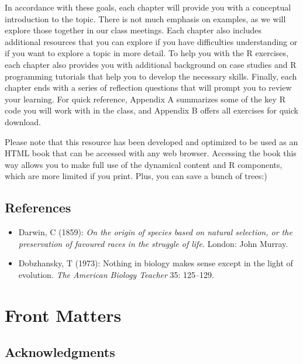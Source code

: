 \documentclass[
]{book}
\providecommand{\tightlist}{%
  \setlength{\itemsep}{0pt}\setlength{\parskip}{0pt}}
\begin{document}
In accordance with these goals, each chapter will provide you with a conceptual introduction to the topic. There is not much emphasis on examples, as we will explore those together in our class meetings. Each chapter also includes additional resources that you can explore if you have difficulties understanding or if you want to explore a topic in more detail. To help you with the R exercises, each chapter also provides you with additional background on case studies and R programming tutorials that help you to develop the necessary skills. Finally, each chapter ends with a series of reflection questions that will prompt you to review your learning. For quick reference, Appendix A summarizes some of the key R code you will work with in the class, and Appendix B offers all exercises for quick download.

Please note that this resource has been developed and optimized to be used as an HTML book that can be accessed with any web browser. Accessing the book this way allows you to make full use of the dynamical content and R components, which are more limited if you print. Plus, you can save a bunch of trees:)

\hypertarget{references}{%
\section*{References}\label{references}}

\begin{itemize}
\tightlist
\item
  Darwin, C (1859): \emph{On the origin of species based on natural selection, or the preservation of favoured races in the struggle of life.} London: John Murray.
\item
  Dobzhansky, T (1973): Nothing in biology makes sense except in the light of evolution. \emph{The American Biology Teacher} 35: 125--129.
\end{itemize}

\hypertarget{front-matters}{%
\chapter*{Front Matters}\label{front-matters}}

\hypertarget{acknowledgments}{%
\section*{Acknowledgments}\label{acknowledgments}}
\end{document}
